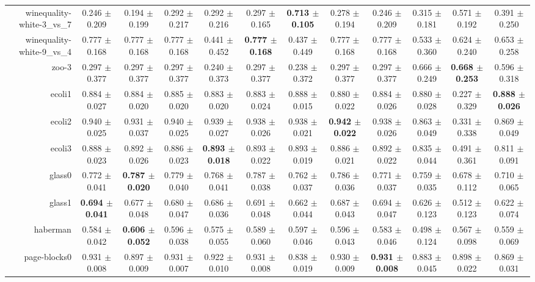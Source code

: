 \begin{table}[!ht]
{\begin{tabular}{r c c c c c c c c c c c}
winequality-white-3\_vs\_7 & 0.246 $\pm$ 0.209 & 0.194 $\pm$ 0.199 & 0.292 $\pm$ 0.217 & 0.292 $\pm$ 0.216 & 0.297 $\pm$ 0.165 & \textbf{0.713 $\pm$ 0.105} & 0.278 $\pm$ 0.194 & 0.246 $\pm$ 0.209 & 0.315 $\pm$ 0.181 & 0.571 $\pm$ 0.192 & 0.391 $\pm$ 0.250 \\
winequality-white-9\_vs\_4 & 0.777 $\pm$ 0.168 & 0.777 $\pm$ 0.168 & 0.777 $\pm$ 0.168 & 0.441 $\pm$ 0.452 & \textbf{0.777 $\pm$ 0.168} & 0.437 $\pm$ 0.449 & 0.777 $\pm$ 0.168 & 0.777 $\pm$ 0.168 & 0.533 $\pm$ 0.360 & 0.624 $\pm$ 0.240 & 0.653 $\pm$ 0.258 \\
zoo-3 & 0.297 $\pm$ 0.377 & 0.297 $\pm$ 0.377 & 0.297 $\pm$ 0.377 & 0.240 $\pm$ 0.373 & 0.297 $\pm$ 0.377 & 0.238 $\pm$ 0.372 & 0.297 $\pm$ 0.377 & 0.297 $\pm$ 0.377 & 0.666 $\pm$ 0.249 & \textbf{0.668 $\pm$ 0.253} & 0.596 $\pm$ 0.318 \\
ecoli1 & 0.884 $\pm$ 0.027 & 0.884 $\pm$ 0.020 & 0.885 $\pm$ 0.020 & 0.883 $\pm$ 0.020 & 0.883 $\pm$ 0.024 & 0.888 $\pm$ 0.015 & 0.880 $\pm$ 0.022 & 0.884 $\pm$ 0.026 & 0.880 $\pm$ 0.028 & 0.227 $\pm$ 0.329 & \textbf{0.888 $\pm$ 0.026} \\
ecoli2 & 0.940 $\pm$ 0.025 & 0.931 $\pm$ 0.037 & 0.940 $\pm$ 0.025 & 0.939 $\pm$ 0.027 & 0.938 $\pm$ 0.026 & 0.938 $\pm$ 0.021 & \textbf{0.942 $\pm$ 0.022} & 0.938 $\pm$ 0.026 & 0.863 $\pm$ 0.049 & 0.331 $\pm$ 0.338 & 0.869 $\pm$ 0.049 \\
ecoli3 & 0.888 $\pm$ 0.023 & 0.892 $\pm$ 0.026 & 0.886 $\pm$ 0.023 & \textbf{0.893 $\pm$ 0.018} & 0.893 $\pm$ 0.022 & 0.893 $\pm$ 0.019 & 0.886 $\pm$ 0.021 & 0.892 $\pm$ 0.022 & 0.835 $\pm$ 0.044 & 0.491 $\pm$ 0.361 & 0.811 $\pm$ 0.091 \\
glass0 & 0.772 $\pm$ 0.041 & \textbf{0.787 $\pm$ 0.020} & 0.779 $\pm$ 0.040 & 0.768 $\pm$ 0.041 & 0.787 $\pm$ 0.038 & 0.762 $\pm$ 0.037 & 0.786 $\pm$ 0.036 & 0.771 $\pm$ 0.037 & 0.759 $\pm$ 0.035 & 0.678 $\pm$ 0.112 & 0.710 $\pm$ 0.065 \\
glass1 & \textbf{0.694 $\pm$ 0.041} & 0.677 $\pm$ 0.048 & 0.680 $\pm$ 0.047 & 0.686 $\pm$ 0.036 & 0.691 $\pm$ 0.048 & 0.662 $\pm$ 0.044 & 0.687 $\pm$ 0.043 & 0.694 $\pm$ 0.047 & 0.626 $\pm$ 0.123 & 0.512 $\pm$ 0.123 & 0.622 $\pm$ 0.074 \\
haberman & 0.584 $\pm$ 0.042 & \textbf{0.606 $\pm$ 0.052} & 0.596 $\pm$ 0.038 & 0.575 $\pm$ 0.055 & 0.589 $\pm$ 0.060 & 0.597 $\pm$ 0.046 & 0.596 $\pm$ 0.043 & 0.583 $\pm$ 0.046 & 0.498 $\pm$ 0.124 & 0.567 $\pm$ 0.098 & 0.559 $\pm$ 0.069 \\
page-blocks0 & 0.931 $\pm$ 0.008 & 0.897 $\pm$ 0.009 & 0.931 $\pm$ 0.007 & 0.922 $\pm$ 0.010 & 0.931 $\pm$ 0.008 & 0.838 $\pm$ 0.019 & 0.930 $\pm$ 0.009 & \textbf{0.931 $\pm$ 0.008} & 0.883 $\pm$ 0.045 & 0.898 $\pm$ 0.022 & 0.869 $\pm$ 0.031 \\

\end{tabular}}
\end{table}
